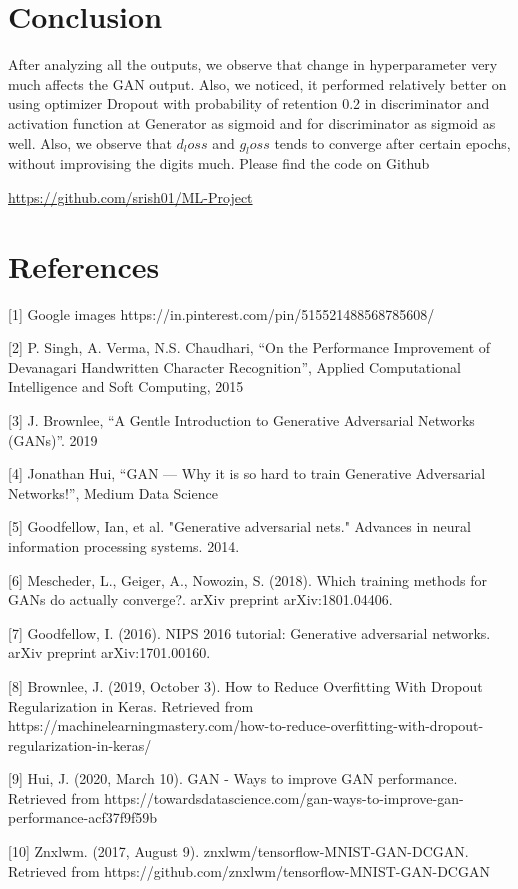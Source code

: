 \documentclass{article}
\begin{document}
\section{Conclusion}
\label{others}

After analyzing all the outputs, we observe that change in hyperparameter very much affects the GAN output. Also, we noticed, it performed relatively better on using optimizer Dropout with probability of retention 0.2 in discriminator and activation function at Generator as sigmoid and for discriminator as sigmoid as well. Also, we observe that $d_loss$ and $g_loss$ tends to converge after certain epochs, without improvising the digits much. Please find the code on Github 
\begin{center}
	\url{https://github.com/srish01/ML-Project}
\end{center}


\section*{References}



\medskip
\small

[1] Google images https://in.pinterest.com/pin/515521488568785608/

[2] P. Singh, A. Verma, N.S. Chaudhari, “On the Performance Improvement of Devanagari Handwritten Character Recognition”, Applied Computational Intelligence and Soft Computing, 2015 

[3] J. Brownlee, “A Gentle Introduction to Generative Adversarial Networks (GANs)”. 2019

[4] Jonathan Hui, “GAN — Why it is so hard to train Generative Adversarial Networks!”, Medium Data Science

[5] Goodfellow, Ian, et al. "Generative adversarial nets." Advances in neural information processing systems. 2014.

[6] Mescheder, L., Geiger, A., Nowozin, S. (2018). Which training methods for GANs do actually converge?. arXiv preprint arXiv:1801.04406.

[7] Goodfellow, I. (2016). NIPS 2016 tutorial: Generative adversarial networks. arXiv preprint arXiv:1701.00160.

[8] Brownlee, J. (2019, October 3). How to Reduce Overfitting With Dropout Regularization in Keras. Retrieved from https://machinelearningmastery.com/how-to-reduce-overfitting-with-dropout-regularization-in-keras/

[9] Hui, J. (2020, March 10). GAN - Ways to improve GAN performance. Retrieved from https://towardsdatascience.com/gan-ways-to-improve-gan-performance-acf37f9f59b

[10] Znxlwm. (2017, August 9). znxlwm/tensorflow-MNIST-GAN-DCGAN. Retrieved from https://github.com/znxlwm/tensorflow-MNIST-GAN-DCGAN
\end{document}
